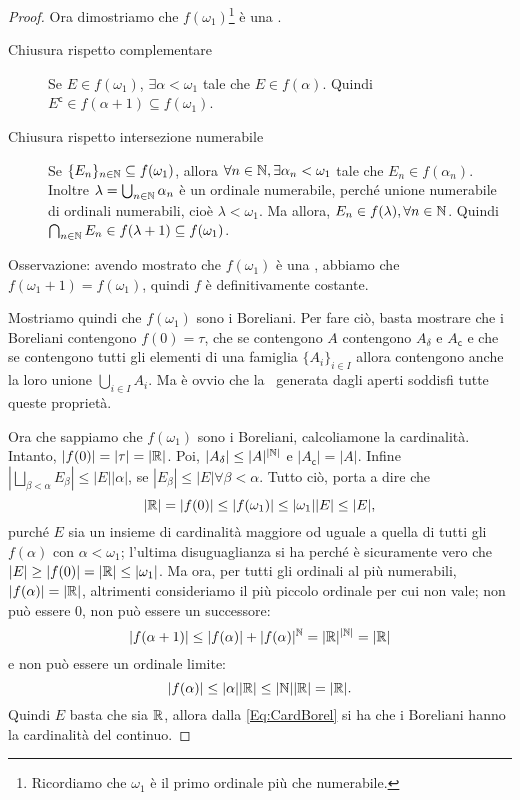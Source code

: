 \begin{proof}
	Ora dimostriamo che $f(\omega_1)$\footnote{Ricordiamo che $\omega_1$ è il primo ordinale più che numerabile.} è una \sigalg.
	\begin{description}
	 \item[Chiusura rispetto complementare] Se $E\in f(\omega_1)$, $\exists \alpha<\omega_1$ tale che $E\in f(\alpha)$.
		Quindi $E^\mathsf{c}\in f(\alpha+1) \subseteq f(\omega_1)$.
	 \item[Chiusura rispetto intersezione numerabile] Se $\{E_n\}_{n\in\mathbb N}\subseteq f(\omega_1)$, allora $\forall n\in\mathbb N, \exists \alpha_n<\omega_1$
		tale che $E_n\in f(\alpha_n)$. Inoltre $\lambda=\bigcup_{n\in\mathbb N}\alpha_n$ è un ordinale numerabile, perché unione numerabile di ordinali
		numerabili, cioè $\lambda<\omega_1$. Ma allora, $E_n\in f(\lambda), \forall n\in\mathbb N$.
		Quindi $\bigcap_{n\in\mathbb N}E_n\in f(\lambda+1)\subseteq f(\omega_1)$.
	\end{description}
	Osservazione: avendo mostrato che $f(\omega_1)$ è una \sigalg, abbiamo che $f(\omega_1+1)=f(\omega_1)$, quindi $f$ è definitivamente costante.
	
	Mostriamo quindi che $f(\omega_1)$ sono i Boreliani.
	Per fare ciò, basta mostrare che i Boreliani contengono $f(0)=\tau$, che se contengono $A$ contengono $A_{\delta}$ e $A_{\mathsf{c}}$ e che
	se contengono tutti gli elementi di una famiglia $\{A_i\}_{i\in I}$ allora contengono anche la loro unione $\bigcup_{i\in I}A_i$.
	Ma è ovvio che la \sigalg \ generata dagli aperti soddisfi tutte queste proprietà.
	
	Ora che sappiamo che $f(\omega_1)$ sono i Boreliani, calcoliamone la cardinalità.
	Intanto, $|f(0)|=|\tau|=|\mathbb R|$. Poi, $|A_{\delta}|\leq |A|^{|\mathbb N|}$ e $|A_{\mathsf{c}}|=|A|$.
	Infine $|\bigsqcup_{\beta<\alpha}E_{\beta}| \leq |E||\alpha|$, se $|E_{\beta}|\leq |E| \forall \beta < \alpha$. Tutto ciò, porta a dire che
	\begin{equation}\label{Eq:CardBorel}
		|\mathbb R|=|f(0)|\leq |f(\omega_1)| \leq |\omega_1||E| \leq |E|,
	\end{equation}
	purché $E$ sia un insieme di cardinalità maggiore od uguale a quella di tutti gli $f(\alpha)$ con $\alpha<\omega_1$;
	l'ultima disuguaglianza si ha perché è sicuramente vero che $|E|\geq |f(0)| = |\mathbb R| \leq |\omega_1|$.
	Ma ora, per tutti gli ordinali al più numerabili, $|f(\alpha)|=|\mathbb R|$, altrimenti consideriamo il più piccolo ordinale per cui non vale;
	non può essere $0$, non può essere un successore:
	\[
		|f(\alpha+1)|\leq |f(\alpha)|+|f(\alpha)|^{\mathbb N} = |\mathbb R|^{|\mathbb N|} = |\mathbb R|
	\]
	e non può essere un ordinale limite:
	\[
		|f(\alpha)|\leq |\alpha| |\mathbb R| \leq |\mathbb N||\mathbb R| = |\mathbb R|.
	\]
	Quindi $E$ basta che sia $\mathbb R$, allora dalla \cref{Eq:CardBorel} si ha che i Boreliani hanno la cardinalità del continuo.
\end{proof}

